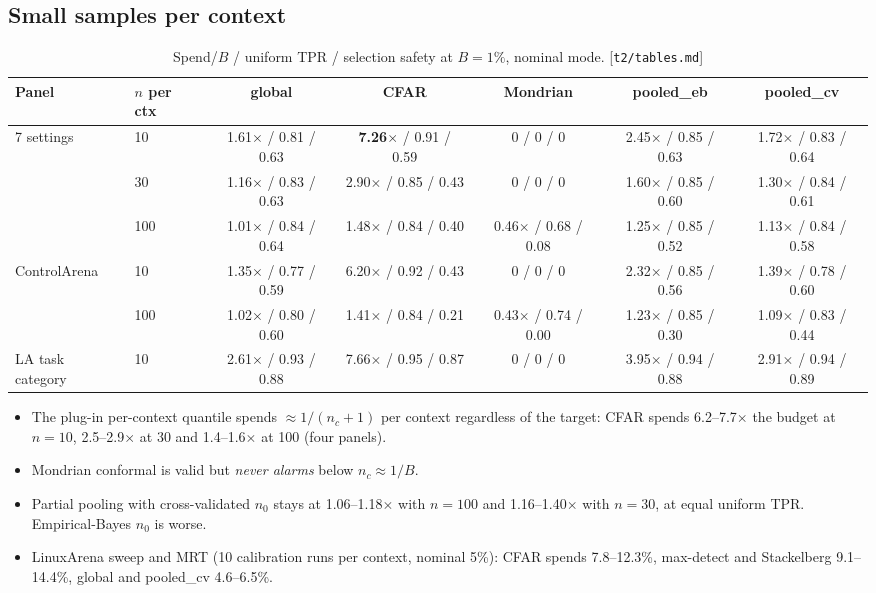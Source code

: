 \documentclass[11pt]{article}
\newcommand{\src}[1]{{\footnotesize\textcolor{ink2}{[\nolinkurl{#1}]}}}
\begin{document}
\subsection{Small samples per context}\label{sec:smalln}
\begin{table}[!htb]\centering\small
\begin{adjustbox}{max width=\linewidth}\begin{tabular}{@{}llccccc@{}}
\toprule
Panel & $n$ per ctx & global & CFAR & Mondrian & pooled\_eb & pooled\_cv\\
\midrule
7 settings & 10 & 1.61$\times$ / 0.81 / 0.63 & \textbf{7.26$\times$} / 0.91 / 0.59 & 0 / 0 / 0 & 2.45$\times$ / 0.85 / 0.63 & 1.72$\times$ / 0.83 / 0.64\\
& 30 & 1.16$\times$ / 0.83 / 0.63 & 2.90$\times$ / 0.85 / 0.43 & 0 / 0 / 0 & 1.60$\times$ / 0.85 / 0.60 & 1.30$\times$ / 0.84 / 0.61\\
& 100 & 1.01$\times$ / 0.84 / 0.64 & 1.48$\times$ / 0.84 / 0.40 & 0.46$\times$ / 0.68 / 0.08 & 1.25$\times$ / 0.85 / 0.52 & 1.13$\times$ / 0.84 / 0.58\\
ControlArena & 10 & 1.35$\times$ / 0.77 / 0.59 & 6.20$\times$ / 0.92 / 0.43 & 0 / 0 / 0 & 2.32$\times$ / 0.85 / 0.56 & 1.39$\times$ / 0.78 / 0.60\\
& 100 & 1.02$\times$ / 0.80 / 0.60 & 1.41$\times$ / 0.84 / 0.21 & 0.43$\times$ / 0.74 / 0.00 & 1.23$\times$ / 0.85 / 0.30 & 1.09$\times$ / 0.83 / 0.44\\
LA task category & 10 & 2.61$\times$ / 0.93 / 0.88 & 7.66$\times$ / 0.95 / 0.87 & 0 / 0 / 0 & 3.95$\times$ / 0.94 / 0.88 & 2.91$\times$ / 0.94 / 0.89\\
\bottomrule
\end{tabular}\end{adjustbox}
\caption{Spend/$B$ / uniform TPR / selection safety at $B=1\%$, nominal mode. \src{t2/tables.md}}
\end{table}
\begin{itemize}
\item The plug-in per-context quantile spends $\approx1/(n_c+1)$ per context regardless of the target: CFAR spends 6.2--7.7$\times$ the budget at $n=10$, 2.5--2.9$\times$ at 30 and 1.4--1.6$\times$ at 100 (four panels).
\item Mondrian conformal is valid but \emph{never alarms} below $n_c\approx1/B$.
\item Partial pooling with cross-validated $n_0$ stays at 1.06--1.18$\times$ with $n=100$ and 1.16--1.40$\times$ with $n=30$, at equal uniform TPR. Empirical-Bayes $n_0$ is worse.
\item LinuxArena sweep and MRT (10 calibration runs per context, nominal 5\%): CFAR spends 7.8--12.3\%, max-detect and Stackelberg 9.1--14.4\%, global and pooled\_cv 4.6--6.5\%.
\end{itemize}
\end{document}
